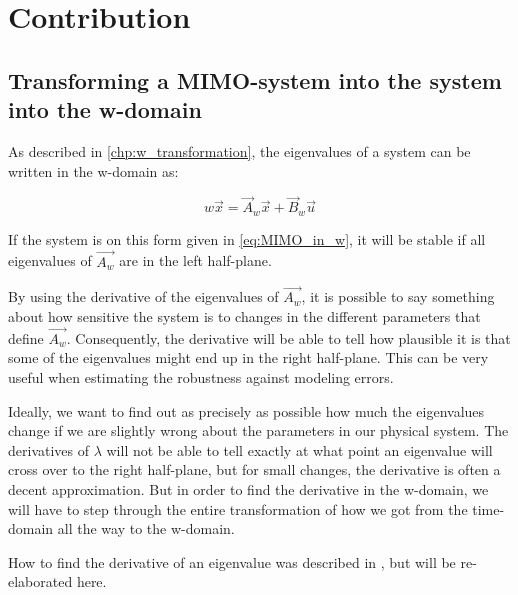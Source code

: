 \chapter{Contribution}
\label{chp:new_findings}
\section{Transforming a MIMO-system into the system into the w-domain}

As described in \cref{chp:w_transformation}, the eigenvalues of a system can be written in the w-domain as: 
 
\begin{equation}
 w\Vec{x} = \Vec{A}_w\Vec{x} + \Vec{B}_w\Vec{u}
 \label{eq:MIMO_in_w}
\end{equation}{}

If the system is on this form given in \cref{eq:MIMO_in_w}, it will be stable if all eigenvalues of $\Vec{A_w}$ are in the left half-plane. 

By using the derivative of the eigenvalues of $\Vec{A_w}$, it is possible to say something about how sensitive the system is to changes in the different parameters that define $\Vec{A_w}$. Consequently, the derivative will be able to tell how plausible it is that some of the eigenvalues might end up in the right half-plane. This can be very useful when estimating the robustness against modeling errors. 

Ideally, we want to find out as precisely as possible how much the eigenvalues change if we are slightly wrong about the parameters in our physical system. The derivatives of $\lambda$ will not be able to tell exactly at what point an eigenvalue will cross over to the right half-plane, but for small changes, the derivative is often a decent approximation. But in order to find the derivative in the w-domain, we will have to step through the entire transformation of how we got from the time-domain all the way to the w-domain. 

How to find the derivative of an eigenvalue was described in \cite{Suul_eigenvalue_presentation}, but will be re-elaborated here. 

